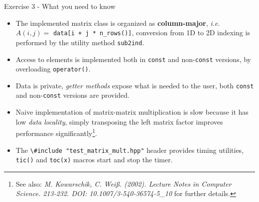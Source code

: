\documentclass[10pt]{beamer}
\begin{document}
\begin{frame}{Exercise 3 - What you need to know}
\begin{itemize}
\item The implemented matrix class is organized as
      \textbf{column-major}, \textit{i.e.}
      $A(i, j) = $ \lstinline{data[i + j * n_rows()]},
      conversion from 1D to 2D indexing is performed by the utility
      method \lstinline{sub2ind}.\\[3mm]
\item Access to elements is implemented both in \texttt{const} and non-\texttt{const} versions, by overloading \lstinline{operator()}. \\[3mm]
\item Data is private, \textit{getter methods} expose what is needed to the user, both \texttt{const} and non-\texttt{const} versions are provided. \\[3mm]
\item Naive implementation of matrix-matrix multiplication is slow because it has low \textit{data locality}, simply transposing the left matrix factor improves performance significantly\footnote{See also: \textit{M. Kowarschik, C. Weiß. (2002). Lecture Notes in Computer Science. 213-232. DOI: 10.1007/3-540-36574-5\_10} for further details.}.\\[3mm]
\item The \lstinline{\#include "test_matrix_mult.hpp"} header provides timing utilities, \lstinline{tic()} and \lstinline{toc(x)} macros start and stop the timer.
\end{itemize}
\end{frame}
\end{document}
